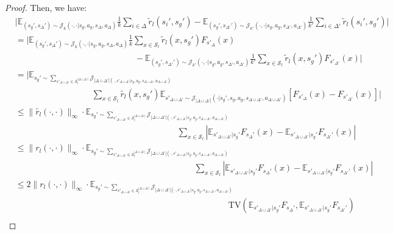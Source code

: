 \documentclass[10pt,a4paper]{amsart}
\def\E{\mathbb{E}}
\begin{document}
\begin{proof}
Then, we have:
\begin{align*}
&\bigg|\E_{(s_g',s_\Delta')\sim\mathcal{J}_k(\cdot,\cdot|s_g,a_g,s_\Delta,a_\Delta)}\frac{1}{k}\sum_{i\in\Delta}\tilde{r}_l(s_i',s_g')- \E_{(s_g',s_{\Delta'}')\sim\mathcal{J}_{k'}(\cdot,\cdot|s_g,a_g,s_{\Delta'}, a_{\Delta'})}\frac{1}{k'}\sum_{i\in\Delta'}\tilde{r}_l(s_i',s_g')\bigg| \\
&= \bigg|\E_{(s_g',s_\Delta')\sim\mathcal{J}_k(\cdot,\cdot|s_g,a_g,s_\Delta,a_\Delta)}\frac{1}{k}\sum_{x\in\mathcal{S}_l}\tilde{r}_l(x,s_g')F_{s'_\Delta}(x)\\ &\quad\quad\quad\quad\quad\quad\quad\quad\quad\quad\quad\quad\quad\quad- \E_{(s_g',s_{\Delta'}')\sim\mathcal{J}_{k'}(\cdot,\cdot|s_g,a_g,s_{\Delta'}, a_{\Delta'})}\frac{1}{k'}\sum_{x\in\mathcal{S}_l}\tilde{r}_l(x,s_g')F_{s'_{\Delta'}}(x)\bigg| \\
&= \bigg|\E_{s_g'\sim \sum_{s'_{\Delta\cup\Delta'}\in\mathcal{S}_l^{|\Delta\cup\Delta'|}}\mathcal{J}_{|\Delta\cup\Delta'|(\cdot,s'_{\Delta\cup\Delta'}|s_g,a_g,s_{\Delta\cup\Delta'},a_{\Delta\cup\Delta'})}}\\ &\quad\quad\quad\quad\quad\quad\quad\quad\quad \sum_{x\in\mathcal{S}_l}\tilde{r_l}(x,s_g')\E_{s'_{\Delta\cup\Delta'}\sim\mathcal{J}_{|\Delta\cup\Delta'|}(\cdot|s_g',s_g,a_g,s_{\Delta\cup\Delta'},a_{\Delta\cup\Delta'})}[F_{s'_\Delta}(x) - F_{s'_{\Delta'}}(x)]\bigg| \\
&\leq \|\tilde{r_l}(\cdot,\cdot)\|_\infty \cdot \E_{s_g'\sim \sum_{s'_{\Delta\cup\Delta'}\in\mathcal{S}_l^{|\Delta\cup\Delta'|}}\mathcal{J}_{|\Delta\cup\Delta'|(\cdot,s'_{\Delta\cup\Delta'}|s_g,a_g,s_{\Delta\cup\Delta'},a_{\Delta\cup\Delta'})}}\\ &\quad\quad\quad\quad\quad\quad\quad\quad\quad\quad\quad\quad\quad\quad\quad\quad\quad\quad\quad\sum_{x\in\mathcal{S}_l}|\E_{s'_{\Delta\cup\Delta'}|s_g'} F_{s_\Delta'}(x) - \E_{s'_{\Delta\cup\Delta'}|s_g'} F_{s_{\Delta'}'}(x)| \\
&\leq \|{r_l}(\cdot,\cdot)\|_\infty \cdot \E_{s_g'\sim \sum_{s'_{\Delta\cup\Delta'}\in\mathcal{S}_l^{|\Delta\cup\Delta'|}}\mathcal{J}_{|\Delta\cup\Delta'|(\cdot,s'_{\Delta\cup\Delta'}|s_g,a_g,s_{\Delta\cup\Delta'},a_{\Delta\cup\Delta'})}}\\ &\quad\quad\quad\quad\quad\quad\quad\quad\quad\quad\quad\quad\quad\quad\quad\quad\quad\quad\quad\quad\quad\sum_{x\in\mathcal{S}_l}|\E_{s'_{\Delta\cup\Delta'}|s_g'} F_{s_\Delta'}(x) - \E_{s'_{\Delta\cup\Delta'}|s_g'} F_{s_{\Delta'}'}(x)| \\
&\leq 2\|r_l(\cdot,\cdot)\|_\infty \cdot \E_{s_g'\sim \sum_{s'_{\Delta\cup\Delta'}\in\mathcal{S}_l^{|\Delta\cup\Delta'|}}\mathcal{J}_{|\Delta\cup\Delta'|(\cdot,s'_{\Delta\cup\Delta'}|s_g,a_g,s_{\Delta\cup\Delta'},a_{\Delta\cup\Delta'})}}\\ &\quad\quad\quad\quad\quad\quad\quad\quad\quad\quad\quad\quad\quad\quad\quad\quad\quad\quad\quad\quad\quad\quad\quad\quad\quad \mathrm{TV}(\E_{s'_{\Delta\cup\Delta'}|s_g'} F_{s_\Delta'}, \E_{s'_{\Delta\cup\Delta'}|s_g'} F_{s_{\Delta'}'}) \\

\end{align*}
\end{proof}
\end{document}
